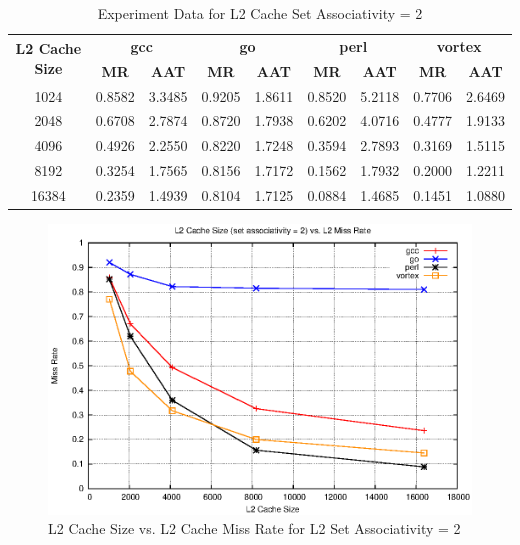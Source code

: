 \documentclass[a4paper]{article}
\begin{document}
\begin{table}[htbp]
    \centering
    \begin{tabular}{|c|c|c|c|c|c|c|c|c|}
        \hline
        \multirow{2}[4]{*}{\bf L2 Cache Size} & \multicolumn{2}{c|}{\bf gcc} & \multicolumn{2}{c|}{\bf go} & \multicolumn{2}{c|}{\bf perl}          &\multicolumn{2}{c|}{\bf vortex}\\
        \cline{2-9} & \bf MR & \bf AAT & \bf MR & \bf AAT & \bf MR & \bf AAT & \bf MR & \bf AAT \\
        \hline
        1024 & 0.8582 & 3.3485 & 0.9205 & 1.8611 & 0.8520 & 5.2118 & 0.7706 & 2.6469 \\
        2048 & 0.6708 & 2.7874 & 0.8720 & 1.7938 & 0.6202 & 4.0716 & 0.4777 & 1.9133 \\
        4096 & 0.4926 & 2.2550 & 0.8220 & 1.7248 & 0.3594 & 2.7893 & 0.3169 & 1.5115 \\
        8192 & 0.3254 & 1.7565 & 0.8156 & 1.7172 & 0.1562 & 1.7932 & 0.2000 & 1.2211 \\
        16384 & 0.2359 & 1.4939 & 0.8104 & 1.7125 & 0.0884 & 1.4685 & 0.1451 & 1.0880 \\
        \hline
    \end{tabular}
    \captionsetup{justification=centering}
    \caption{Experiment Data for L2 Cache Set Associativity = 2}
    \label{tab:l2mr_data_sa2}
\end{table}

\begin{figure}
    \centering
    \includegraphics[scale=1.3] {l2_sa_2.eps}
    \caption{L2 Cache Size vs. L2 Cache Miss Rate for L2 Set Associativity = 2}
    \label{fig:l2mr_graph_sa2}
\end{figure}
\end{document}
